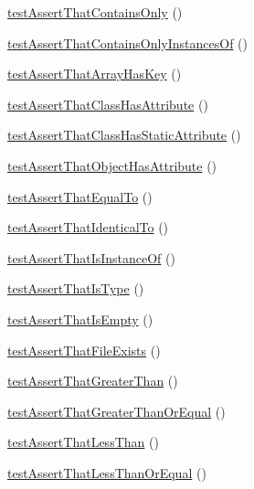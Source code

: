 \begin{DoxyCompactItemize}
\mbox{\hyperlink{class_framework___assert_test_ab4d6125c1818e40cb8239aed3d9488c8}{test\+Assert\+That\+Contains\+Only}} ()
\item 
\mbox{\hyperlink{class_framework___assert_test_a3d160f566339e3a7ddd8a12d0445b24e}{test\+Assert\+That\+Contains\+Only\+Instances\+Of}} ()
\item 
\mbox{\hyperlink{class_framework___assert_test_a55b9afbd083c9326b41e5f94670f2df6}{test\+Assert\+That\+Array\+Has\+Key}} ()
\item 
\mbox{\hyperlink{class_framework___assert_test_a30744d9f664921ea28ccf40f6ed93075}{test\+Assert\+That\+Class\+Has\+Attribute}} ()
\item 
\mbox{\hyperlink{class_framework___assert_test_a9e89d93933e99ac69925872ece86fc63}{test\+Assert\+That\+Class\+Has\+Static\+Attribute}} ()
\item 
\mbox{\hyperlink{class_framework___assert_test_ab74d844b81e72165bd21879e4bc73693}{test\+Assert\+That\+Object\+Has\+Attribute}} ()
\item 
\mbox{\hyperlink{class_framework___assert_test_a11842bda322e94e814307967e5f81f17}{test\+Assert\+That\+Equal\+To}} ()
\item 
\mbox{\hyperlink{class_framework___assert_test_a51c67700c8f354e6565561c12f97354b}{test\+Assert\+That\+Identical\+To}} ()
\item 
\mbox{\hyperlink{class_framework___assert_test_a2d421e83aa7d2dc1ab7d44af06fbeb40}{test\+Assert\+That\+Is\+Instance\+Of}} ()
\item 
\mbox{\hyperlink{class_framework___assert_test_a26e22a47cae4bd558e65bc5ad2556c86}{test\+Assert\+That\+Is\+Type}} ()
\item 
\mbox{\hyperlink{class_framework___assert_test_ab095f30a9e5cca60b13fe3ae0d52f5eb}{test\+Assert\+That\+Is\+Empty}} ()
\item 
\mbox{\hyperlink{class_framework___assert_test_aa13b77ade3c75fef5675c21d35125a9d}{test\+Assert\+That\+File\+Exists}} ()
\item 
\mbox{\hyperlink{class_framework___assert_test_a1f2a7f187da1763b9d39b71818065cb2}{test\+Assert\+That\+Greater\+Than}} ()
\item 
\mbox{\hyperlink{class_framework___assert_test_a31b12d76563609f8fab68c3cdaa7e577}{test\+Assert\+That\+Greater\+Than\+Or\+Equal}} ()
\item 
\mbox{\hyperlink{class_framework___assert_test_ae7ea8ad1bcdb8ecb1121f1559fc61269}{test\+Assert\+That\+Less\+Than}} ()
\item 
\mbox{\hyperlink{class_framework___assert_test_a356adca2fa3b96f4c4523bceee464008}{test\+Assert\+That\+Less\+Than\+Or\+Equal}} ()

\end{DoxyCompactItemize}
